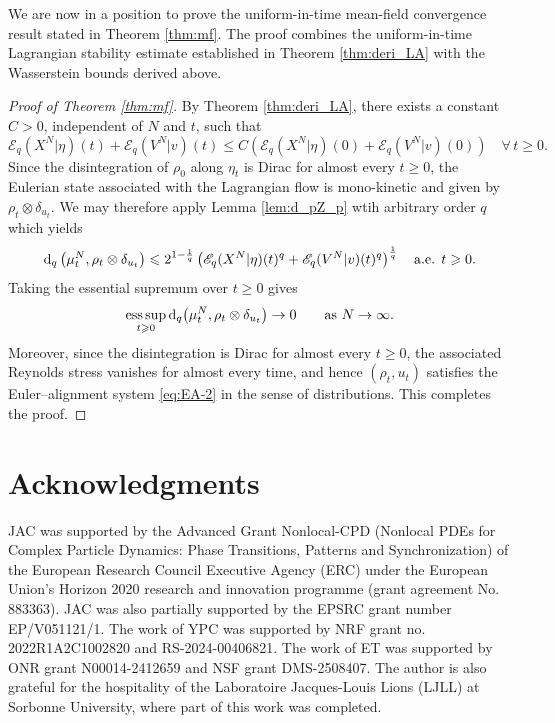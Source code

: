 \documentclass[10pt,reqno]{amsart}
\DeclareMathOperator*{\esssup}{ess\,sup}
\renewcommand{\geq}{\geqslant}
\renewcommand{\ge}{\geqslant}
\renewcommand{\le}{\leqslant}
\numberwithin{equation}{section}
\newcommand{\lt}{\left}
\newcommand{\rt}{\right}
\newcommand{\rd}{\textnormal{d}}
\begin{document}
 
%
%
%                      
%
%
 
 
We are now in a position to prove the uniform-in-time mean-field convergence result stated in Theorem \ref{thm:mf}. The proof combines the uniform-in-time Lagrangian stability estimate established in Theorem \ref{thm:deri_LA} with the Wasserstein bounds derived above.
 
\begin{proof}[Proof of Theorem \ref{thm:mf}]
By Theorem \ref{thm:deri_LA}, there exists a constant $C>0$, independent of $N$ and $t$, such that
\[
\mathscr{E}_q(X^N|\eta)(t) + \mathscr{E}_q(V^N|v)(t) \le  C\lt(\mathscr{E}_q(X^N|\eta)(0)+\mathscr{E}_q(V^N|v)(0)\rt) \quad \forall\,t\ge0.
\]
Since the disintegration of $\rho_0$ along $\eta_t$ is Dirac for almost every $t\ge0$, the Eulerian state associated with the Lagrangian flow is mono-kinetic and given by
$\rho_t\otimes\delta_{u_t}$. We may therefore apply Lemma \ref{lem:d_pZ_p} wtih arbitrary order $q$ which yields
\[
\rd_q \left(\mu_t^N, \rho_t\otimes\delta_{u_t}\right)  \le  2^{1 - \frac1q}\lt( \mathscr{E}_q(X^N|\eta)(t)^q+\mathscr{E}_q(V^N|v)(t)^q \rt)^{\frac1q}  \quad \text{a.e. } t \geq 0.
\]
Taking the essential supremum over $t\ge0$ gives
\[
\esssup_{t\ge0}\rd_q \bigl(\mu_t^N, \rho_t\otimes\delta_{u_t}\bigr)\to 0 \qquad \mbox{as } N\to\infty.
\]
Moreover, since the disintegration is Dirac for almost every $t\ge0$, the associated Reynolds stress vanishes for almost every time, and hence $(\rho_t,u_t)$ satisfies the Euler--alignment system \eqref{eq:EA-2} in the sense of distributions. This completes the proof.
\end{proof}


%
%
%
%
%
%

\section*{Acknowledgments}
JAC was supported by the Advanced Grant Nonlocal-CPD (Nonlocal PDEs for Complex Particle Dynamics: Phase Transitions, Patterns and Synchronization) of the European Research Council Executive Agency (ERC) under the European Union’s Horizon 2020 research and innovation programme (grant agreement No. 883363). JAC was also partially supported by the EPSRC grant number EP/V051121/1. 
The work of YPC was supported by NRF grant no. 2022R1A2C1002820 and RS-2024-00406821. The work of ET was supported by ONR grant  N00014-2412659 and NSF grant DMS-2508407.  The author is also grateful for the hospitality of the Laboratoire Jacques-Louis Lions (LJLL) at Sorbonne University, where part of this work was completed. 
\end{document}
